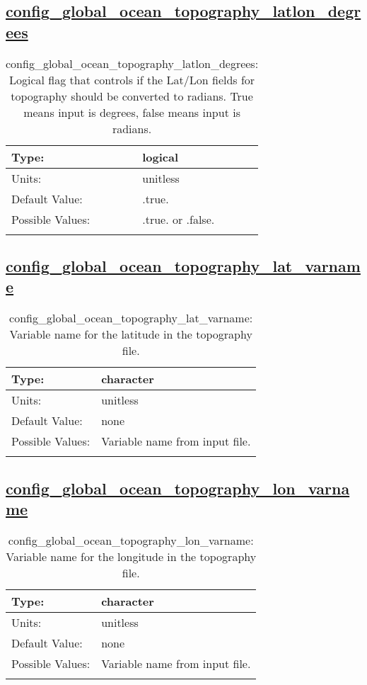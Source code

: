 \subsection[config\_global\_ocean\_topography\_latlon\_degrees]{\hyperref[sec:nm_tab_global_ocean]{config\_global\_ocean\_topography\_latlon\_degrees}}
\label{subsec:nm_sec_config_global_ocean_topography_latlon_degrees}
\begin{center}
\begin{longtable}{| p{2.0in} || p{4.0in} |}
    \hline
    Type: & logical \\
    \hline
    Units: & \si{unitless} \\
    \hline
    Default Value: & .true. \\
    \hline
    Possible Values: & .true. or .false. \\
    \hline
    \caption{config\_global\_ocean\_topography\_latlon\_degrees: Logical flag that controls if the Lat/Lon fields for topography should be converted to radians. True means input is degrees, false means input is radians.}
\end{longtable}
\end{center}
\subsection[config\_global\_ocean\_topography\_lat\_varname]{\hyperref[sec:nm_tab_global_ocean]{config\_global\_ocean\_topography\_lat\_varname}}
\label{subsec:nm_sec_config_global_ocean_topography_lat_varname}
\begin{center}
\begin{longtable}{| p{2.0in} || p{4.0in} |}
    \hline
    Type: & character \\
    \hline
    Units: & \si{unitless} \\
    \hline
    Default Value: & none \\
    \hline
    Possible Values: & Variable name from input file. \\
    \hline
    \caption{config\_global\_ocean\_topography\_lat\_varname: Variable name for the latitude in the topography file.}
\end{longtable}
\end{center}
\subsection[config\_global\_ocean\_topography\_lon\_varname]{\hyperref[sec:nm_tab_global_ocean]{config\_global\_ocean\_topography\_lon\_varname}}
\label{subsec:nm_sec_config_global_ocean_topography_lon_varname}
\begin{center}
\begin{longtable}{| p{2.0in} || p{4.0in} |}
    \hline
    Type: & character \\
    \hline
    Units: & \si{unitless} \\
    \hline
    Default Value: & none \\
    \hline
    Possible Values: & Variable name from input file. \\
    \hline
    \caption{config\_global\_ocean\_topography\_lon\_varname: Variable name for the longitude in the topography file.}
\end{longtable}
\end{center}
